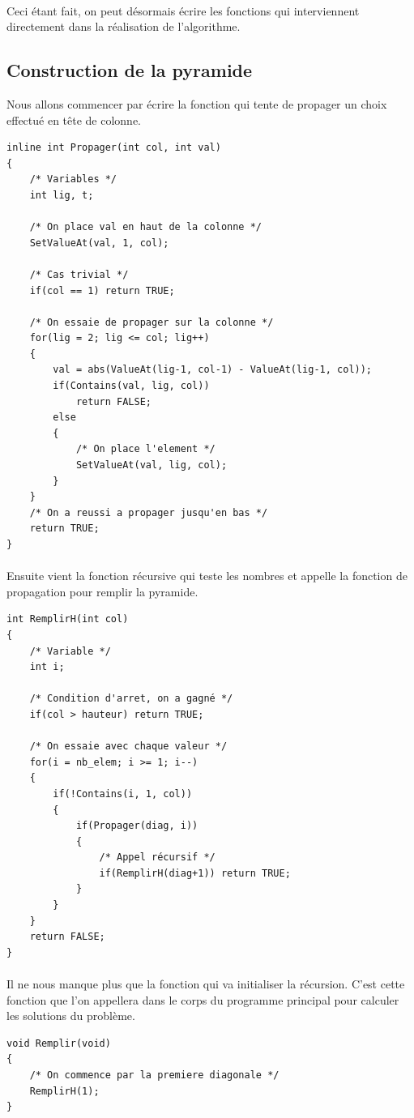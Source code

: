 \documentclass[10pt]{article}%
\begin{document}
\paragraph*{}
  Ceci étant fait, on peut désormais écrire les fonctions qui interviennent directement dans
  la réalisation de l'algorithme.

\subsection*{Construction de la pyramide}
  Nous allons commencer par écrire la fonction qui tente de propager un choix effectué en tête
  de colonne.
  \begin{verbatim}
inline int Propager(int col, int val)
{
    /* Variables */
    int lig, t;

    /* On place val en haut de la colonne */
    SetValueAt(val, 1, col);

    /* Cas trivial */
    if(col == 1) return TRUE;

    /* On essaie de propager sur la colonne */
    for(lig = 2; lig <= col; lig++)
    {
        val = abs(ValueAt(lig-1, col-1) - ValueAt(lig-1, col));
        if(Contains(val, lig, col))
            return FALSE;
        else
        {
            /* On place l'element */
            SetValueAt(val, lig, col);
        }
    }
    /* On a reussi a propager jusqu'en bas */
    return TRUE;
}
  \end{verbatim}

\paragraph*{}
  Ensuite vient la fonction récursive qui teste les nombres et 
  appelle la fonction de propagation pour remplir la pyramide.
  \begin{verbatim}
int RemplirH(int col)
{
    /* Variable */
    int i;

    /* Condition d'arret, on a gagné */
    if(col > hauteur) return TRUE;

    /* On essaie avec chaque valeur */
    for(i = nb_elem; i >= 1; i--)
    {
        if(!Contains(i, 1, col))
        {
            if(Propager(diag, i))
            {
                /* Appel récursif */
                if(RemplirH(diag+1)) return TRUE;
            }
        }
    }
    return FALSE;
}

  \end{verbatim}

\paragraph*{}
  Il ne nous manque plus que la fonction qui va initialiser la récursion.
  C'est cette fonction que l'on appellera dans le corps du programme principal
  pour calculer les solutions du problème.
  \begin{verbatim}
void Remplir(void)
{
    /* On commence par la premiere diagonale */
    RemplirH(1);
}
  \end{verbatim}
\end{document}
